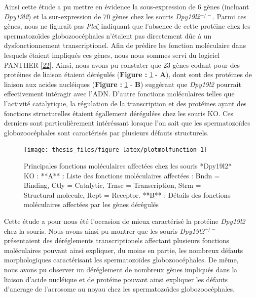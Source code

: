 \documentclass[12pt,twoside]{reedthesis}
\theoremstyle{definition}
\theoremstyle{definition}
\theoremstyle{remark}
\begin{document}
  Ainsi cette étude a pu mettre en évidence la sous-expression de 6 gènes
  (incluant \emph{Dpy19l2}) et la sur-expression de 70 gènes chez les
  souris \emph{Dpy19l2}\(^{-/-}\). Parmi ces gènes, nous ne figurait pas
  \emph{Plc}\(\zeta\) indiquant que l'absence de cette protéine chez les
  spermatozoïdes globozoocéphales n'étaient pas directement dûe à un
  dysfonctionnement transcriptionel. Afin de prédire les fonction
  moléculaire dans lesquels étaient impliqués ces gènes, nous nous sommes
  servi du logiciel PANTHER {[}\protect\hyperlink{ref-Mi2017}{22}{]}.
  Ainsi, nous avons pu constater que 23 gènes codant pour des protéines de
  liaison étaient dérégulés (\textbf{Figure : }\ref{fig:plotmolfunction} -
  \textbf{A}), dont sont des protéines de liaison aux acides nucléiques
  (\textbf{Figure : }\ref{fig:plotmolfunction} - \textbf{B}) suggérant que
  \emph{Dpy19l2} pourrait effectivement intéragir avec l'ADN. D'autre
  fonctions moléculaires telles que l'activité catalytique, la régulation
  de la transcription et des protéines ayant des fonctions structurelles
  étaient égallement dérégulées chez les souris KO. Ces derniers sont
  particulièrement intéréssant lorsque l'on sait que les spermatozoïdes
  globozoocéphales sont caractérisés par plusieurs défauts structurels.
  
  \begin{figure}
  
  {\centering \texttt{[image: thesis\_files/figure-latex/plotmolfunction-1]} 
  
  }
  
  \caption[Principales fonctions moléculaires affectées chez les souris *Dpy19l2* KO]{Principales fonctions moléculaires affectées chez les souris *Dpy19l2* KO  :  **A** : Liste des fonctions moléculaires affectées : Bndn = Binding, Ctly = Catalytic, Trnsc = Transcription, Strm = Structural molecule, Rcpt = Receptor. **B** : Détails des fonctions moléculaires affectées par les gènes dérégulés}\label{fig:plotmolfunction}
  \end{figure}
  
  \newpage 
  
  Cette étude a pour nous été l'occasion de mieux caractérisé la protéine
  \emph{Dpy19l2} chez la souris. Nous avons ainsi pu montrer que les
  souris \emph{Dpy19l2}\(^{-/-}\) présentaient des déréglements
  transcriptionels affectant plusieurs fonctions moléculaires pouvant
  ainsi expliquer, du moins en partie, les nombreux défauts morphologiques
  caractérisant les spermatozoïdes globozoocéphales. De même, nous avons
  pu observer un déréglement de nombreux gènes impliqués dans la liaison
  d'acide nucléique et de protéine pouvant ainsi expliquer les défauts
  d'ancrage de l'acrosome au noyau chez les spermatozoïdes
  globozoocéphales.
  
\end{document}
